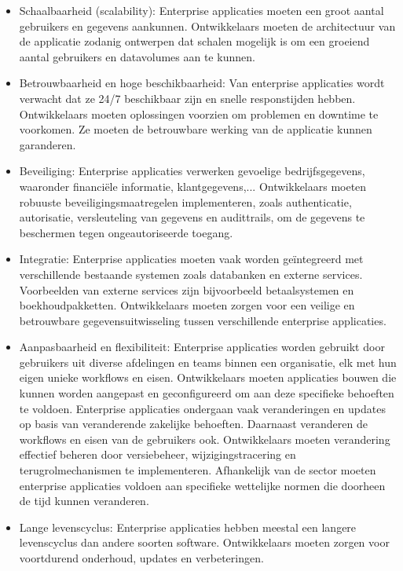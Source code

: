 \begin{itemize}
\item{Schaalbaarheid (scalability):} Enterprise applicaties moeten een groot aantal gebruikers en gegevens aankunnen.  Ontwikkelaars moeten de architectuur van de applicatie zodanig ontwerpen dat schalen mogelijk is om een groeiend aantal gebruikers en datavolumes aan te kunnen.

\item{Betrouwbaarheid en hoge beschikbaarheid:} Van enterprise applicaties wordt verwacht dat ze 24/7 beschikbaar zijn en snelle responstijden hebben.  Ontwikkelaars moeten oplossingen voorzien om problemen en downtime te voorkomen.  Ze moeten de betrouwbare werking van de applicatie kunnen garanderen.

\item{Beveiliging:} Enterprise applicaties verwerken gevoelige bedrijfsgegevens, waaronder financiële informatie, klantgegevens,...   Ontwikkelaars moeten robuuste beveiligingsmaatregelen implementeren,  zoals authenticatie,  autorisatie,  versleuteling van gegevens en audittrails,  om de gegevens te beschermen tegen ongeautoriseerde toegang.

\item{Integratie:} Enterprise applicaties moeten vaak worden geïntegreerd met verschillende bestaande systemen zoals databanken en externe services.  Voorbeelden van externe services zijn bijvoorbeeld betaalsystemen en boekhoudpakketten. Ontwikkelaars moeten zorgen voor een veilige en betrouwbare gegevensuitwisseling tussen verschillende enterprise applicaties. 

\item{Aanpasbaarheid en flexibiliteit:} Enterprise applicaties worden gebruikt door gebruikers uit diverse afdelingen en teams binnen een organisatie, elk met hun eigen unieke workflows en eisen. Ontwikkelaars moeten applicaties bouwen die kunnen worden aangepast en geconfigureerd om aan deze specifieke behoeften te voldoen. 
Enterprise applicaties ondergaan vaak veranderingen en updates op basis van veranderende zakelijke behoeften. Daarnaast veranderen de workflows en eisen van de gebruikers ook. 
Ontwikkelaars moeten verandering effectief beheren door versiebeheer, wijzigingstracering en terugrolmechanismen te implementeren.
Afhankelijk van de sector moeten enterprise applicaties voldoen aan specifieke wettelijke normen die doorheen de tijd kunnen veranderen. 

\item{Lange levenscyclus:} Enterprise applicaties hebben meestal een langere levenscyclus dan andere soorten software.  Ontwikkelaars moeten zorgen voor voortdurend onderhoud,  updates en verbeteringen.


\end{itemize}
